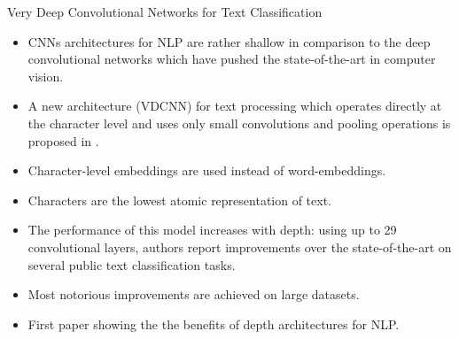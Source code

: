\begin{frame}{Very Deep Convolutional Networks for Text Classification}
\begin{scriptsize}
\begin{itemize}
\item CNNs architectures for NLP are rather shallow in comparison to the deep convolutional networks which have pushed the state-of-the-art in computer vision.
\item A new architecture (VDCNN) for text processing which operates directly at the character level and uses only small convolutions and pooling operations is proposed in \cite{conneau2017very}.

\item Character-level embeddings are used instead of word-embeddings.

\item Characters are the lowest atomic representation of text. 

\item The performance of this model increases with depth: using up to 29 convolutional layers, authors report improvements over the state-of-the-art on several public text classification tasks. 

\item Most notorious improvements are achieved on large datasets.

\item First paper showing the the benefits  of  depth architectures for NLP.
\end{itemize}
\end{scriptsize}
\end{frame}






